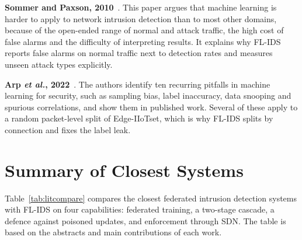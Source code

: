 \textbf{Sommer and Paxson, 2010}~\cite{sommer2010}. This paper argues that machine learning is harder to apply to network intrusion detection than to most other domains, because of the open-ended range of normal and attack traffic, the high cost of false alarms and the difficulty of interpreting results. It explains why FL-IDS reports false alarms on normal traffic next to detection rates and measures unseen attack types explicitly.

\textbf{Arp \emph{et al.}, 2022}~\cite{arp2022}. The authors identify ten recurring pitfalls in machine learning for security, such as sampling bias, label inaccuracy, data snooping and spurious correlations, and show them in published work. Several of these apply to a random packet-level split of Edge-IIoTset, which is why FL-IDS splits by connection and fixes the label leak.

\section{Summary of Closest Systems}\label{sec:litsummary}
Table~\ref{tab:litcompare} compares the closest federated intrusion detection systems with FL-IDS on four capabilities: federated training, a two-stage cascade, a defence against poisoned updates, and enforcement through SDN. The table is based on the abstracts and main contributions of each work.

